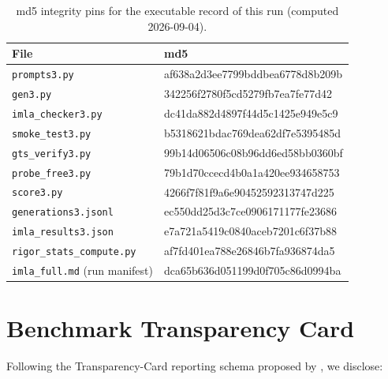 \documentclass[11pt]{article}
\begin{document}
\begin{table}[t]
\centering
\scriptsize
\begin{tabular}{@{}ll@{}}
\toprule
File & md5 \\
\midrule
\texttt{prompts3.py} & af638a2d3ee7799bddbea6778d8b209b \\
\texttt{gen3.py} & 342256f2780f5cd5279fb7ea7fe77d42 \\
\texttt{imla\_checker3.py} & dc41da882d4897f44d5c1425e949e5c9 \\
\texttt{smoke\_test3.py} & b5318621bdac769dea62df7e5395485d \\
\texttt{gts\_verify3.py} & 99b14d06506c08b96dd6ed58bb0360bf \\
\texttt{probe\_free3.py} & 79b1d70ccecd4b0a1a420ee934658753 \\
\texttt{score3.py} & 4266f7f81f9a6e90452592313747d225 \\
\texttt{generations3.jsonl} & ec550dd25d3c7ce0906171177fe23686 \\
\texttt{imla\_results3.json} & e7a721a5419c0840aceb7201c6f37b88 \\
\texttt{rigor\_stats\_compute.py} & af7fd401ea788e26846b7fa936874da5 \\
\texttt{imla\_full.md} (run manifest) & dca65b636d051199d0f705c86d0994ba \\
\bottomrule
\end{tabular}
\caption{md5 integrity pins for the executable record of this run (computed 2026-09-04).}
\label{tab:md5}
\end{table}

\section{Benchmark Transparency Card}

Following the Transparency-Card reporting schema proposed by \citet{transpcards2024}, we disclose:
\end{document}
